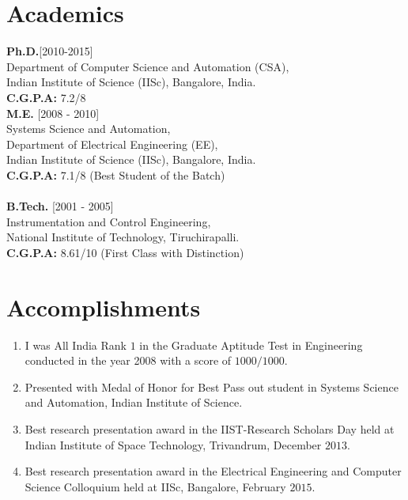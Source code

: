 \documentclass[line,margin]{res}
\begin{document}
\begin{resume}
\section{Academics}
\textbf{Ph.D.}[2010-2015] \\
Department of Computer Science and Automation (CSA), \\
Indian Institute of Science (IISc), Bangalore, India. \\
\textbf{C.G.P.A:} 7.2/8 \\
\textbf{M.E.} [2008 - 2010] \\
Systems Science and Automation,\\
Department of Electrical Engineering (EE), \\
Indian Institute of Science (IISc), Bangalore, India. \\
\textbf{C.G.P.A:} 7.1/8 (Best Student of the Batch) \\
\\
\textbf{B.Tech.} [2001 - 2005]\\
Instrumentation and Control Engineering, \\
National Institute of Technology, Tiruchirapalli.\\
\textbf{C.G.P.A:} 8.61/10 (First Class with Distinction)  \\

\section{Accomplishments}
\begin{enumerate}
\item I was All India Rank $1$ in the Graduate Aptitude Test in Engineering conducted in the year 2008 with a score of $1000/1000$.
\item Presented with Medal of Honor for Best Pass out student in Systems Science and Automation, Indian Institute of Science.
\item Best research presentation award in the IIST-Research Scholars Day held at Indian Institute of Space Technology, Trivandrum, December $2013$.
\item Best research presentation award in the Electrical Engineering and Computer Science Colloquium held at IISc, Bangalore, February $2015$.
\end{enumerate}



\end{resume}
\end{document}
